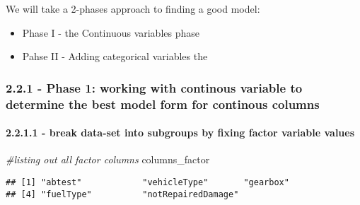 \documentclass[]{article}
\newenvironment{Shaded}{\begin{snugshade}}{\end{snugshade}}
\newcommand{\CommentTok}[1]{\textcolor[rgb]{0.56,0.35,0.01}{\textit{#1}}}
\newcommand{\DataTypeTok}[1]{\textcolor[rgb]{0.13,0.29,0.53}{#1}}
\newcommand{\KeywordTok}[1]{\textcolor[rgb]{0.13,0.29,0.53}{\textbf{#1}}}
\newcommand{\NormalTok}[1]{#1}
\newcommand{\OperatorTok}[1]{\textcolor[rgb]{0.81,0.36,0.00}{\textbf{#1}}}
\newcommand{\OtherTok}[1]{\textcolor[rgb]{0.56,0.35,0.01}{#1}}
\newcommand{\StringTok}[1]{\textcolor[rgb]{0.31,0.60,0.02}{#1}}
\providecommand{\tightlist}{%
  \setlength{\itemsep}{0pt}\setlength{\parskip}{0pt}}
\let\oldparagraph\paragraph
\renewcommand{\paragraph}[1]{\oldparagraph{#1}\mbox{}}
\begin{document}
We will take a 2-phases approach to finding a good model:

\begin{itemize}
\tightlist
\item
  Phase I - the Continuous variables phase
\item
  Pahse II - Adding categorical variables the
\end{itemize}

\hypertarget{phase-1-working-with-continous-variable-to-determine-the-best-model-form-for-continous-columns}{%
\subsubsection{2.2.1 - Phase 1: working with continous variable to
determine the best model form for continous
columns}\label{phase-1-working-with-continous-variable-to-determine-the-best-model-form-for-continous-columns}}

\hypertarget{break-data-set-into-subgroups-by-fixing-factor-variable-values}{%
\paragraph{2.2.1.1 - break data-set into subgroups by fixing factor
variable
values}\label{break-data-set-into-subgroups-by-fixing-factor-variable-values}}

\begin{Shaded}
\begin{Highlighting}[]
\CommentTok{#listing out all factor columns}
\NormalTok{columns_factor}
\end{Highlighting}
\end{Shaded}

\begin{verbatim}
## [1] "abtest"            "vehicleType"       "gearbox"          
## [4] "fuelType"          "notRepairedDamage"
\end{verbatim}

\begin{Shaded}
\end{Shaded}
\end{document}
